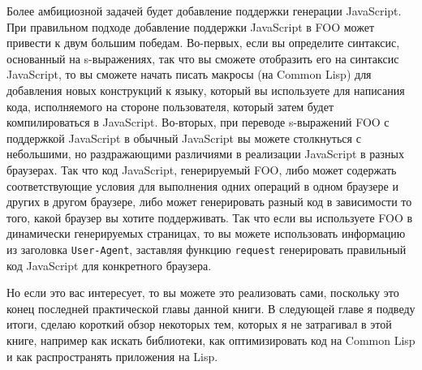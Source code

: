 Более амбициозной задачей будет добавление поддержки генерации JavaScript.  При правильном
подходе добавление поддержки JavaScript в FOO может привести к двум большим победам.
Во-первых, если вы определите синтаксис, основанный на s-выражениях, так что вы сможете
отобразить его на синтаксис JavaScript, то вы сможете начать писать макросы (на Common
Lisp) для добавления новых конструкций к языку, который вы используете для написания кода,
исполняемого на стороне пользователя, который затем будет компилироваться в JavaScript.
Во-вторых, при переводе s-выражений FOO с поддержкой JavaScript в обычный JavaScript вы
можете столкнуться с небольшими, но раздражающими различиями в реализации JavaScript в
разных браузерах.  Так что код JavaScript, генерируемый FOO, либо может содержать
соответствующие условия для выполнения одних операций в одном браузере и других в другом
браузере, либо может генерировать разный код в зависимости то того, какой браузер вы
хотите поддерживать.  Так что если вы используете FOO в динамически генерируемых
страницах, то вы можете использовать информацию из заголовка \lstinline{User-Agent},
заставляя функцию \lstinline{request} генерировать правильный код JavaScript для
конкретного браузера.

Но если это вас интересует, то вы можете это реализовать сами, поскольку это конец
последней практической главы данной книги.  В следующей главе я подведу итоги, сделаю
короткий обзор некоторых тем, которых я не затрагивал в этой книге, например как искать
библиотеки, как оптимизировать код на Common Lisp и как распространять приложения на Lisp.

